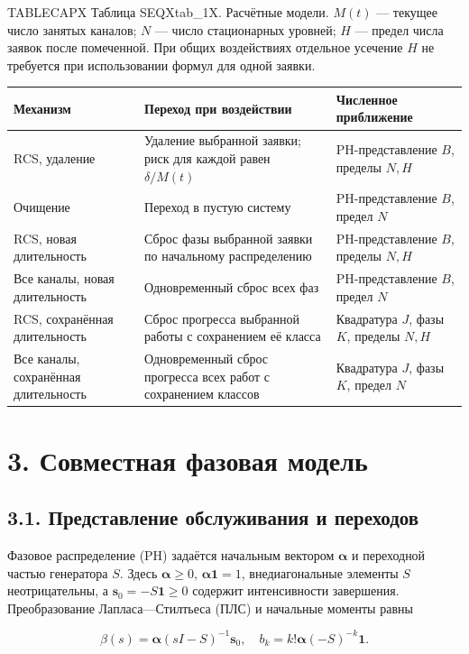 \noindent TABLECAPX Таблица SEQXtab_1X. Расчётные модели. \(M(t)\) --- текущее число занятых каналов; \(N\) --- число стационарных уровней; \(H\) --- предел числа заявок после помеченной. При общих воздействиях отдельное усечение \(H\) не требуется при использовании формул для одной заявки.\par


\begin{tabular}{p{3.6cm}p{6.0cm}p{5.0cm}}
\toprule
Механизм & Переход при воздействии & Численное приближение \\
\midrule
RCS, удаление & Удаление выбранной заявки; риск для каждой равен \(\delta/M(t)\) & PH-представление \(B\), пределы \(N,H\) \\
Очищение & Переход в пустую систему & PH-представление \(B\), предел \(N\) \\
RCS, новая длительность & Сброс фазы выбранной заявки по начальному распределению & PH-представление \(B\), пределы \(N,H\) \\
Все каналы, новая длительность & Одновременный сброс всех фаз & PH-представление \(B\), предел \(N\) \\
RCS, сохранённая длительность & Сброс прогресса выбранной работы с сохранением её класса & Квадратура \(J\), фазы \(K\), пределы \(N,H\) \\
Все каналы, сохранённая длительность & Одновременный сброс прогресса всех работ с сохранением классов & Квадратура \(J\), фазы \(K\), предел \(N\) \\
\bottomrule
\end{tabular}




\section*{3. Совместная фазовая модель}
\subsection*{3.1. Представление обслуживания и переходов}
Фазовое распределение (PH) задаётся начальным вектором \(\boldsymbol\alpha\) и переходной частью генератора \(S\). Здесь \(\boldsymbol\alpha\ge0\), \(\boldsymbol\alpha\mathbf1=1\), внедиагональные элементы \(S\) неотрицательны, а \(\boldsymbol s_0=-S\mathbf1\ge0\) содержит интенсивности завершения. Преобразование Лапласа—Стилтьеса (ПЛС) и начальные моменты равны


\[\beta(s)=\boldsymbol\alpha(sI-S)^{-1}\boldsymbol s_0,\quad
b_k=k!\boldsymbol\alpha(-S)^{-k}\mathbf1.\]


